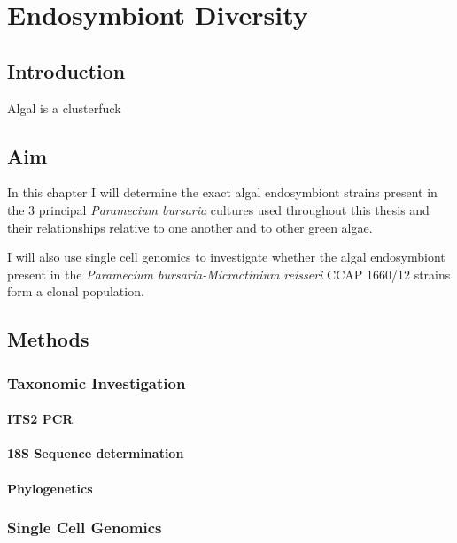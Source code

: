 % 
\graphicspath{{chapters/3.Chapter_1/figures}}

\chapter{Endosymbiont Diversity}\label{chap:endo_diversity}

\section{Introduction}

Algal is a clusterfuck

\section{Aim}

In this chapter I will determine the exact algal endosymbiont strains present
in the 3 principal \textit{Paramecium bursaria} cultures used throughout
this thesis and their relationships relative to one another and to
other green algae.

I will also use single cell genomics to investigate whether the algal
endosymbiont present in the \textit{Paramecium bursaria-Micractinium reisseri}
CCAP 1660/12 strains form a clonal population. 

\section{Methods}

\subsection{Taxonomic Investigation}
    
\subsubsection{ITS2 PCR}

\subsubsection{18S Sequence determination}

\subsubsection{Phylogenetics}

\subsection{Single Cell Genomics}

